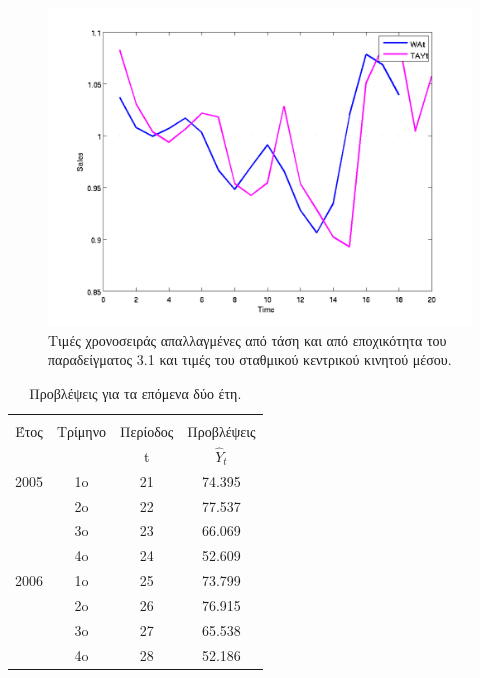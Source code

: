 \begin{table} [h]
\begin{center}
\begin{tabular}{|c|c|c|c|c|c|c|c|}
      \hline
    \end{tabular}
  \end{center}
\end{table}

\begin{figure} [ht]
  \centering
  \includegraphics[totalheight=4in,angle=0]{graff6.png}
  \caption{Τιμές χρονοσειράς απαλλαγμένες από τάση και από εποχικότητα του παραδείγματος 3.1 και τιμές του σταθμικού κεντρικού κινητού μέσου.}
\end{figure}

\begin{table} [h]
  \caption{Προβλέψεις για τα επόμενα δύο έτη.} 
  \label{tab_5}
  \begin{center}
    \begin{tabular}{|c |c | c| c|}
      \hline 
       &  &  &  \\
       Έτος &Τρίμηνο   &Περίοδος   &Προβλέψεις  \\
       &   & t  & $\widehat{Y}_t$  \\    
       \hline \hline
       2005 & 1o & 21 & 74.395 \\
            & 2o & 22 & 77.537 \\
            & 3o & 23 & 66.069 \\
            & 4o & 24 & 52.609 \\
       2006 & 1o & 25 & 73.799 \\
            & 2o & 26 & 76.915 \\
            & 3o & 27 & 65.538 \\
            & 4o & 28 & 52.186 \\     
      \hline
    \end{tabular}
  \end{center}
\end{table}

